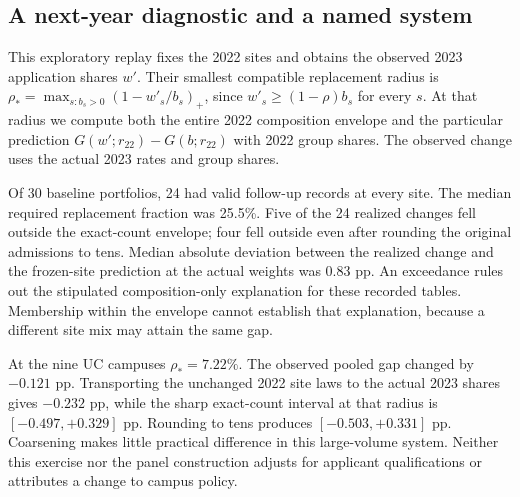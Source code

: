 \documentclass[11pt]{article}
\begin{document}
\subsection{A next-year diagnostic and a named system}
This exploratory replay fixes the 2022 sites and obtains the observed 2023 application shares $w'$. Their smallest compatible replacement radius is
$\rho_*=\max_{s:b_s>0}(1-w'_s/b_s)_+$, since $w'_s\ge(1-\rho)b_s$ for every $s$. At that radius we compute both the entire 2022 composition envelope and the particular prediction $G(w';r_{22})-G(b;r_{22})$ with 2022 group shares. The observed change uses the actual 2023 rates and group shares.

Of 30 baseline portfolios, 24 had valid follow-up records at every site. The median required replacement fraction was 25.5\%. Five of the 24 realized changes fell outside the exact-count envelope; four fell outside even after rounding the original admissions to tens. Median absolute deviation between the realized change and the frozen-site prediction at the actual weights was 0.83 pp. An exceedance rules out the stipulated composition-only explanation for these recorded tables. Membership within the envelope cannot establish that explanation, because a different site mix may attain the same gap.

At the nine UC campuses $\rho_*=7.22\%$. The observed pooled gap changed by $-0.121$ pp. Transporting the unchanged 2022 site laws to the actual 2023 shares gives $-0.232$ pp, while the sharp exact-count interval at that radius is $[-0.497,+0.329]$ pp. Rounding to tens produces $[-0.503,+0.331]$ pp. Coarsening makes little practical difference in this large-volume system. Neither this exercise nor the panel construction adjusts for applicant qualifications or attributes a change to campus policy.
\end{document}
